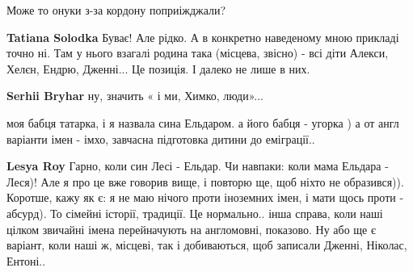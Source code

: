 \begin{itemize}
Може то онуки з-за кордону поприіжджали?

\begin{itemize}
 
\textbf{Tatiana Solodka} Буває! Але рідко. А в конкретно наведеному мною прикладі точно ні. Там у нього взагалі родина така (місцева, звісно) - всі діти Алекси, Хелєн, Ендрю, Дженні... Це позиція. І далеко не лише в них.

 
\textbf{Serhii Bryhar} ну, значить « і ми, Химко, люди»...
\end{itemize}

 
моя бабця татарка, і я назвала сина Ельдаром.
а його бабця - угорка )
а от англ варіанти імен - імхо, завчасна підготовка дитини до еміграції..

\begin{itemize}
 
\textbf{Lesya Roy} Гарно, коли син Лесі - Ельдар. Чи навпаки: коли мама Ельдара - Леся)! Але я про це вже говорив вище, і повторю ще, щоб ніхто не образився)). Коротше, кажу як є: я не маю нічого проти іноземних імен, і мати щось проти - абсурд). То сімейні історії, традиції. Це нормально.. інша справа, коли наші цілком звичайні імена перейначують на англомовні, показово. Ну або ще є варіант, коли наші ж, місцеві, так і добиваються, щоб записали Дженні, Ніколас, Ентоні..

 

\end{itemize}
\end{itemize}
